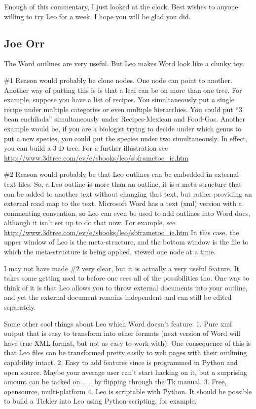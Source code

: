 \documentclass[a4paper,10pt,english]{sphinxmanual}
\begin{document}
Enough of this commentary, I just looked at the clock. Best wishes to anyone
willing to try Leo for a week. I hope you will be glad you did.


\subsection{Joe Orr}
\label{testimonials:joe-orr}
The Word outlines are very useful. But Leo makes Word look like a clunky toy.

\#1 Reason would probably be clone nodes. One node can point to another. Another
way of putting this is is that a leaf can be on more than one tree. For
example, suppose you have a list of recipes. You simultaneously put a single
recipe under multiple categories or even multiple hierarchies. You could put ``3
bean enchilada'' simultaneously under Recipes-Mexican and Food-Gas. Another
example would be, if you are a biologist trying to decide under which genus to
put a new species, you could put the species under two simultaneously. In
effect, you can build a 3-D tree. For a further illustration see
\href{http://www.3dtree.com/ev/e/sbooks/leo/sbframetoc\_ie.htm}{http://www.3dtree.com/ev/e/sbooks/leo/sbframetoc\_ie.htm}

\#2 Reason would probably be that Leo outlines can be embedded in external text
files. So, a Leo outline is more than an outline, it is a meta-structure that
can be added to another text without changing that text, but rather providing
an external road map to the text. Microsoft Word has a text (xml) version with a
commenting convention, so Leo can even be used to add outlines into Word docs,
although it isn't set up to do that now. For example, see
\href{http://www.3dtree.com/ev/e/sbooks/leo/sbframetoc\_ie.htm}{http://www.3dtree.com/ev/e/sbooks/leo/sbframetoc\_ie.htm} In this case, the upper
window of Leo is the meta-structure, and the bottom window is the file to which
the meta-structure is being applied, viewed one node at a time.

I may not have made \#2 very clear, but it is actually a very useful feature. It
takes some getting used to before one sees all of the possibilities tho. One
way to think of it is that Leo allows you to throw external documents into your
outline, and yet the external document remains independent and can still be
edited separately.

Some other cool things about Leo which Word doesn't feature:
1. Pure xml output that is easy to transform into other formats (next
version of Word will have true XML format, but not as easy to work with).
One consequence of this is that Leo files can be transformed pretty easily
to web pages with their outlining capability intact.
2. Easy to add features since is programmed in Python and open source. Maybe
your average user can't start hacking on it, but a surprising amount can be
tacked on...
.. by flipping through the Tk manual.
3. Free, opensource, multi-platform
4. Leo is scriptable with Python. It should be possible to build a Tickler
into Leo using Python scripting, for example.
\end{document}

